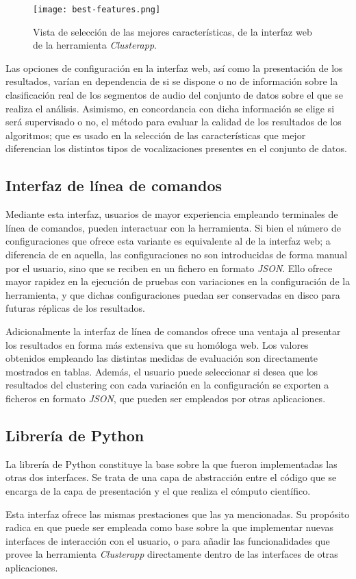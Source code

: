 \begin{figure}[!h]
    \centering
    \texttt{[image: best-features.png]}
    \caption{Vista de selección de las mejores características, de la interfaz web de la herramienta \textit{Clusterapp}.}
    \label{img:best-features}
\end{figure}

Las opciones de configuración en la interfaz web, así como la presentación de los resultados, varían en dependencia de si se dispone o no de información sobre la clasificación real de los segmentos de audio del conjunto de datos sobre el que se realiza el análisis.
Asimismo, en concordancia con dicha información se elige si será supervisado o no, el método para evaluar la calidad de los resultados de los algoritmos;
que es usado en la selección de las características que mejor diferencian los distintos tipos de vocalizaciones presentes en el conjunto de datos.

\subsection{Interfaz de línea de comandos}\label{subsec:CLI}

Mediante esta interfaz, usuarios de mayor experiencia empleando terminales de línea de comandos, pueden interactuar con la herramienta.
Si bien el número de configuraciones que ofrece esta variante es equivalente al de la interfaz web;
a diferencia de en aquella, las configuraciones no son introducidas de forma manual por el usuario, sino que se reciben en un fichero en formato \textit{JSON}.
Ello ofrece mayor rapidez en la ejecución de pruebas con variaciones en la configuración de la herramienta, y que dichas configuraciones puedan ser conservadas en disco para futuras réplicas de los resultados.

Adicionalmente la interfaz de línea de comandos ofrece una ventaja al presentar los resultados en forma más extensiva que su homóloga web.
Los valores obtenidos empleando las distintas medidas de evaluación son directamente mostrados en tablas.
Además, el usuario puede seleccionar si desea que los resultados del clustering con cada variación en la configuración se exporten a ficheros en formato \textit{JSON}, que pueden ser empleados por otras aplicaciones.

\subsection{Librería de Python}\label{subsec:libreríaDePython}

La librería de Python constituye la base sobre la que fueron implementadas las otras dos interfaces.
Se trata de una capa de abstracción entre el código que se encarga de la capa de presentación y el que realiza el cómputo científico.

Esta interfaz ofrece las mismas prestaciones que las ya mencionadas.
Su propósito radica en que puede ser empleada como base sobre la que implementar nuevas interfaces de interacción con el usuario, o para añadir las funcionalidades que provee la herramienta \textit{Clusterapp} directamente dentro de las interfaces de otras aplicaciones.